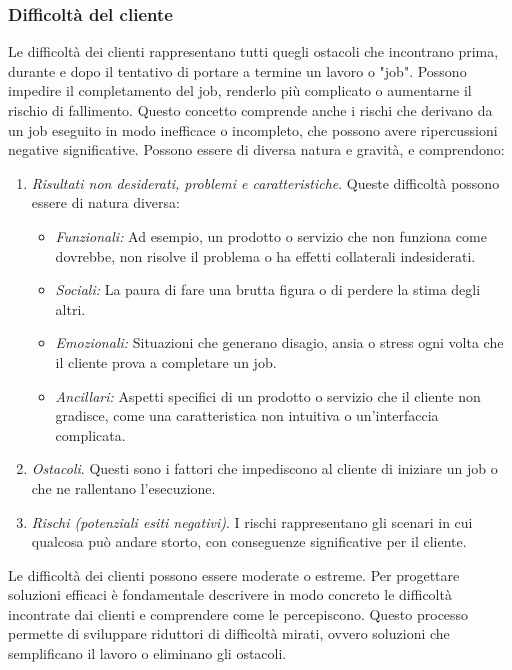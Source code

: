 \subsubsection{Difficoltà del cliente}
Le difficoltà dei clienti rappresentano tutti quegli ostacoli che incontrano prima, durante e dopo il tentativo di portare a termine un lavoro o "job". Possono impedire il completamento del job, renderlo più complicato o aumentarne il rischio di fallimento. Questo concetto comprende anche i rischi che derivano da un job eseguito in modo inefficace o incompleto, che possono avere ripercussioni negative significative. Possono essere di diversa natura e gravità, e comprendono:
\begin{enumerate}
    \item \textit{Risultati non desiderati, problemi e caratteristiche}.
    Queste difficoltà possono essere di natura diversa:
    \begin{itemize}
        \item \textit{Funzionali:} Ad esempio, un prodotto o servizio che non funziona come dovrebbe, non risolve il problema o ha effetti collaterali indesiderati.
    \item \textit{Sociali:} La paura di fare una brutta figura o di perdere la stima degli altri.
    \item \textit{Emozionali:} Situazioni che generano disagio, ansia o stress ogni volta che il cliente prova a completare un job.
    \item \textit{Ancillari:} Aspetti specifici di un prodotto o servizio che il cliente non gradisce, come una caratteristica non intuitiva o un'interfaccia complicata.
    \end{itemize}
    \item \textit{Ostacoli}.
    Questi sono i fattori che impediscono al cliente di iniziare un job o che ne rallentano l’esecuzione.
    \item \textit{Rischi (potenziali esiti negativi)}.
    I rischi rappresentano gli scenari in cui qualcosa può andare storto, con conseguenze significative per il cliente.
\end{enumerate}
Le difficoltà dei clienti possono essere moderate o estreme.
Per progettare soluzioni efficaci è fondamentale descrivere in modo concreto le difficoltà incontrate dai clienti e comprendere come le percepiscono. Questo processo permette di sviluppare riduttori di difficoltà mirati, ovvero soluzioni che semplificano il lavoro o eliminano gli ostacoli.

